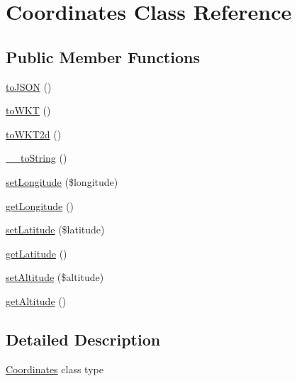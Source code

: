 \hypertarget{classCoordinates}{
\section{Coordinates Class Reference}
\label{dd/d43/classCoordinates}
}
\subsection*{Public Member Functions}
\begin{DoxyCompactItemize}
\item 
\hyperlink{classCoordinates_a2c8206157a6557dc4458b99f69e98c1c}{toJSON} ()
\item 
\hyperlink{classCoordinates_a0460cf095a3b74aaae15b6f67bcd7a78}{toWKT} ()
\item 
\hyperlink{classCoordinates_a061f1cc42ca8f08309aad6fbe8f4c5b8}{toWKT2d} ()
\item 
\hyperlink{classCoordinates_a1040fb14667be62f7d91e63569b80efc}{\_\-\_\-toString} ()
\item 
\hyperlink{classCoordinates_a63191d2f1aa81886b8961f35e3299777}{setLongitude} (\$longitude)
\item 
\hyperlink{classCoordinates_a90c9c8c14ede0e53193de5537f6be86b}{getLongitude} ()
\item 
\hyperlink{classCoordinates_aac827a477761c60be458f653fbf4312b}{setLatitude} (\$latitude)
\item 
\hyperlink{classCoordinates_a3024b1d98280cfccc977b6758550afc9}{getLatitude} ()
\item 
\hyperlink{classCoordinates_a3065b9ba573410b34fe02185765d123c}{setAltitude} (\$altitude)
\item 
\hyperlink{classCoordinates_a1dbb3c709b47c90c6a7fbf8dbe10f214}{getAltitude} ()
\end{DoxyCompactItemize}


\subsection{Detailed Description}
\hyperlink{classCoordinates}{Coordinates} class type 

